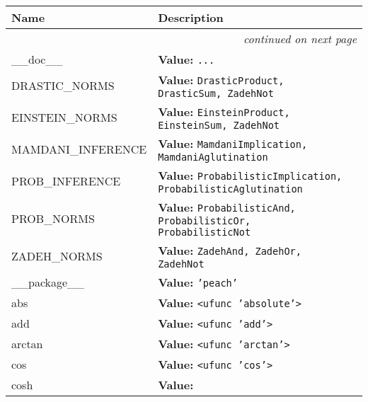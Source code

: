     \vspace{-1cm}
\hspace{\varindent}\begin{longtable}{|p{\varnamewidth}|p{\vardescrwidth}|l}
\cline{1-2}
\cline{1-2} \centering \textbf{Name} & \centering \textbf{Description}& \\
\cline{1-2}
\endhead\cline{1-2}\multicolumn{3}{r}{\small\textit{continued on next page}}\\\endfoot\cline{1-2}
\endlastfoot\raggedright \_\-\_\-d\-o\-c\-\_\-\_\- & \raggedright \textbf{Value:} 
{\tt \texttt{...}}&\\
\cline{1-2}
\raggedright D\-R\-A\-S\-T\-I\-C\-\_\-N\-O\-R\-M\-S\- & \raggedright \textbf{Value:} 
{\tt DrasticProduct, DrasticSum, ZadehNot}&\\
\cline{1-2}
\raggedright E\-I\-N\-S\-T\-E\-I\-N\-\_\-N\-O\-R\-M\-S\- & \raggedright \textbf{Value:} 
{\tt EinsteinProduct, EinsteinSum, ZadehNot}&\\
\cline{1-2}
\raggedright M\-A\-M\-D\-A\-N\-I\-\_\-I\-N\-F\-E\-R\-E\-N\-C\-E\- & \raggedright \textbf{Value:} 
{\tt MamdaniImplication, MamdaniAglutination}&\\
\cline{1-2}
\raggedright P\-R\-O\-B\-\_\-I\-N\-F\-E\-R\-E\-N\-C\-E\- & \raggedright \textbf{Value:} 
{\tt ProbabilisticImplication, ProbabilisticAglutination}&\\
\cline{1-2}
\raggedright P\-R\-O\-B\-\_\-N\-O\-R\-M\-S\- & \raggedright \textbf{Value:} 
{\tt ProbabilisticAnd, ProbabilisticOr, ProbabilisticNot}&\\
\cline{1-2}
\raggedright Z\-A\-D\-E\-H\-\_\-N\-O\-R\-M\-S\- & \raggedright \textbf{Value:} 
{\tt ZadehAnd, ZadehOr, ZadehNot}&\\
\cline{1-2}
\raggedright \_\-\_\-p\-a\-c\-k\-a\-g\-e\-\_\-\_\- & \raggedright \textbf{Value:} 
{\tt \texttt{'}\texttt{peach}\texttt{'}}&\\
\cline{1-2}
\raggedright a\-b\-s\- & \raggedright \textbf{Value:} 
{\tt {\textless}ufunc 'absolute'{\textgreater}}&\\
\cline{1-2}
\raggedright a\-d\-d\- & \raggedright \textbf{Value:} 
{\tt {\textless}ufunc 'add'{\textgreater}}&\\
\cline{1-2}
\raggedright a\-r\-c\-t\-a\-n\- & \raggedright \textbf{Value:} 
{\tt {\textless}ufunc 'arctan'{\textgreater}}&\\
\cline{1-2}
\raggedright c\-o\-s\- & \raggedright \textbf{Value:} 
{\tt {\textless}ufunc 'cos'{\textgreater}}&\\
\cline{1-2}
\raggedright c\-o\-s\-h\- & \raggedright \textbf{Value:} 

\end{longtable}
